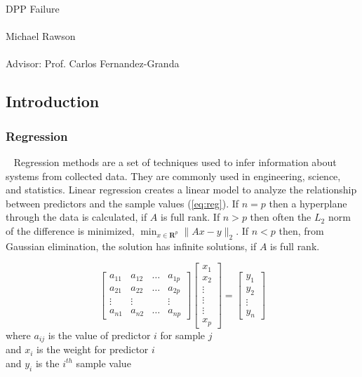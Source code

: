 \documentclass{article}
\begin{document}
\begin{center}
\Large
DPP Failure\\
\normalsize
~\\
Michael Rawson\\
~\\
Advisor: Prof. Carlos Fernandez-Granda
\end{center}

\subsection*{Introduction}
\subsubsection*{Regression}
\qquad ~ Regression methods are a set of techniques used to infer information about systems from collected data. They are commonly used in engineering, science, and statistics. Linear regression creates a linear model to analyze the relationship between predictors and the sample values (\ref{eq:reg}). If $n=p$ then a hyperplane through the data is calculated, if $A$ is full rank. If $n>p$ then often the $L_2$ norm of the difference is minimized, $\min_{x\in \mathbf R^p} \|Ax-y\|_2$. If $n<p$ then, from Gaussian elimination, the solution has infinite solutions, if $A$ is full rank. 

\begin{equation} \label{eq:reg}
\begin{bmatrix}
    a_{11}       & a_{12} & \dots & a_{1p} \\
    a_{21}       & a_{22} & \dots & a_{2p} \\
    \vdots	    & \vdots  &          & \vdots  \\
    a_{n1}       & a_{n2} & \dots & a_{np}
\end{bmatrix} \begin{bmatrix}
    x_{1} \\
    x_{2} \\
    \vdots \\
    \vdots \\
    \vdots \\
    x_{p}
\end{bmatrix}=\begin{bmatrix}
    y_{1} \\
    y_{2} \\
    \vdots \\
    y_{n}
\end{bmatrix}
\end{equation}
where $a_{ij}$ is the value of predictor $i$ for sample $j$\\
and $x_i$ is the weight for predictor $i$\\
and $y_i$ is the $i^{th}$ sample value\\
\end{document}
